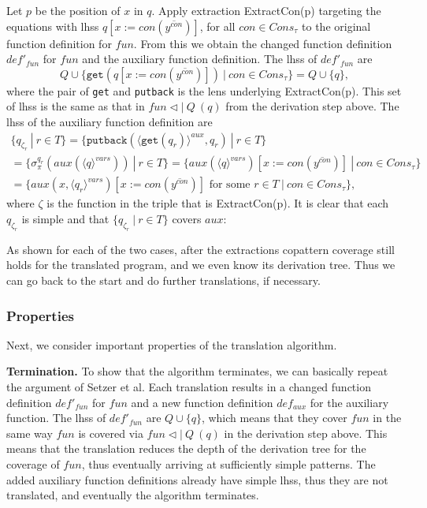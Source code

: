 \begin{algorithm}
\begin{enumerate}
Let $p$ be the position of $x$ in $q$. Apply extraction \textsf{ExtractCon}(p) targeting the equations with lhss $q[x := con(\overline{y^{con}})]$, for all $con \in Cons_\tau$ to the original function definition for $fun$. From this we obtain the changed function definition $def'_{fun}$ for $fun$ and the auxiliary function definition. The lhss of $def'_{fun}$ are
\[
Q \cup \{ \texttt{get}(q[x := con(\overline{y^{con}})]) ~ | ~ con \in Cons_\tau \} = Q \cup \{q\},
\]
where the pair of \texttt{get} and \texttt{putback} is the lens underlying \textsf{ExtractCon}(p). This set of lhss is the same as that in $fun \lhd | ~ Q ~ (q)$ from the derivation step above. The lhss of the auxiliary function definition are
\begin{multline*}
\{ q_{\zeta_r} ~ | ~ r \in T \} = \{ \texttt{putback}(\langle \texttt{get}(q_r) \rangle^{aux}, q_r) ~ | ~ r \in T \} \\
= \{ \sigma^{q_r}_\pi(aux(\langle q \rangle^{vars})) ~ | ~ r \in T \} = \{ aux(\langle q \rangle^{vars})[x := con(\overline{y^{con}})] ~ | ~ con \in Cons_\tau \} \\
= \{ aux(x, \langle q_r \rangle^{vars})[x := con(\overline{y^{con}})] \text{ for some } r \in T ~ | ~ con \in Cons_\tau \},
\end{multline*}
where $\zeta$ is the function in the triple that is \textsf{ExtractCon}(p). It is clear that each $q_{\zeta_r}$ is simple and that $\{ q_{\zeta_r} ~ | ~ r \in T \}$ covers $aux$:
\begin{prooftree}
\AxiomC{}
\end{prooftree}
\end{enumerate}

As shown for each of the two cases, after the extractions copattern coverage still holds for the translated program, and we even know its derivation tree. Thus we can go back to the start and do further translations, if necessary.
\end{algorithm}

\subsubsection{Properties}

Next, we consider important properties of the translation algorithm.

\textbf{Termination.} To show that the algorithm terminates, we can basically repeat the argument of Setzer et al. Each translation results in a changed function definition $def'_{fun}$ for $fun$ and a new function definition $def_{aux}$ for the auxiliary function. The lhss of $def'_{fun}$ are $Q \cup \{q\}$, which means that they cover $fun$ in the same way $fun$ is covered via $fun \lhd | ~ Q ~ (q)$ in the derivation step above. This means that the translation reduces the depth of the derivation tree for the coverage of $fun$, thus eventually arriving at sufficiently simple patterns. The added auxiliary function definitions already have simple lhss, thus they are not translated, and eventually the algorithm terminates.

